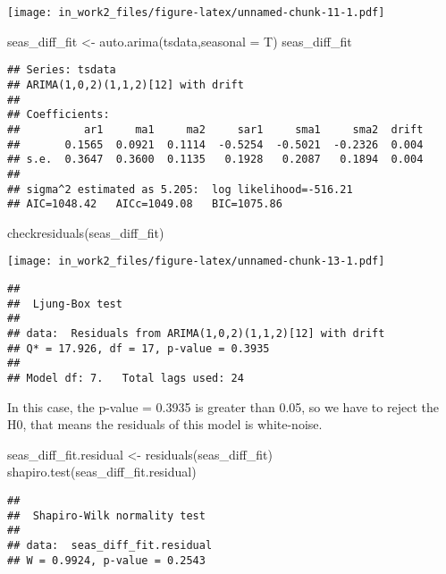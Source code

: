 \documentclass[
]{article}
\newenvironment{Shaded}{\begin{snugshade}}{\end{snugshade}}
\newcommand{\AttributeTok}[1]{\textcolor[rgb]{0.77,0.63,0.00}{#1}}
\newcommand{\FunctionTok}[1]{\textcolor[rgb]{0.00,0.00,0.00}{#1}}
\newcommand{\NormalTok}[1]{#1}
\newcommand{\OtherTok}[1]{\textcolor[rgb]{0.56,0.35,0.01}{#1}}
\begin{document}
\texttt{[image: in\_work2\_files/figure-latex/unnamed-chunk-11-1.pdf]}

\begin{Shaded}
\begin{Highlighting}[]
\NormalTok{seas\_diff\_fit }\OtherTok{\textless{}{-}} \FunctionTok{auto.arima}\NormalTok{(tsdata,}\AttributeTok{seasonal =}\NormalTok{ T)}
\NormalTok{seas\_diff\_fit}
\end{Highlighting}
\end{Shaded}

\begin{verbatim}
## Series: tsdata 
## ARIMA(1,0,2)(1,1,2)[12] with drift 
## 
## Coefficients:
##          ar1     ma1     ma2     sar1     sma1     sma2  drift
##       0.1565  0.0921  0.1114  -0.5254  -0.5021  -0.2326  0.004
## s.e.  0.3647  0.3600  0.1135   0.1928   0.2087   0.1894  0.004
## 
## sigma^2 estimated as 5.205:  log likelihood=-516.21
## AIC=1048.42   AICc=1049.08   BIC=1075.86
\end{verbatim}

\begin{Shaded}
\begin{Highlighting}[]
\FunctionTok{checkresiduals}\NormalTok{(seas\_diff\_fit)}
\end{Highlighting}
\end{Shaded}

\texttt{[image: in\_work2\_files/figure-latex/unnamed-chunk-13-1.pdf]}

\begin{verbatim}
## 
##  Ljung-Box test
## 
## data:  Residuals from ARIMA(1,0,2)(1,1,2)[12] with drift
## Q* = 17.926, df = 17, p-value = 0.3935
## 
## Model df: 7.   Total lags used: 24
\end{verbatim}

In this case, the p-value = 0.3935 is greater than 0.05, so we have to
reject the H0, that means the residuals of this model is white-noise.

\begin{Shaded}
\begin{Highlighting}[]
\NormalTok{seas\_diff\_fit.residual }\OtherTok{\textless{}{-}} \FunctionTok{residuals}\NormalTok{(seas\_diff\_fit)}
\FunctionTok{shapiro.test}\NormalTok{(seas\_diff\_fit.residual)}
\end{Highlighting}
\end{Shaded}

\begin{verbatim}
## 
##  Shapiro-Wilk normality test
## 
## data:  seas_diff_fit.residual
## W = 0.9924, p-value = 0.2543
\end{verbatim}
\end{document}

